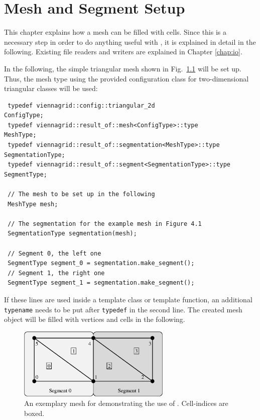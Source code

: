 \chapter{Mesh and Segment Setup} \label{chap:meshsetup}

This chapter explains how a {\ViennaGrid} mesh can be filled with cells. Since this
is a necessary step in order to do anything useful with {\ViennaGrid}, it is explained in detail in the following.
Existing file readers and writers are explained in Chapter \ref{chap:io}.


In the following, the simple triangular mesh shown in Fig.~\ref{fig:samplemesh} will be set up.
Thus, the mesh type using the provided configuration class for two-dimensional triangular classes will be used:
\begin{lstlisting}
 typedef viennagrid::config::triangular_2d                      ConfigType;
 typedef viennagrid::result_of::mesh<ConfigType>::type        MeshType;
 typedef viennagrid::result_of::segmentation<MeshType>::type  SegmentationType;
 typedef viennagrid::result_of::segment<SegmentationType>::type  SegmentType;

 // The mesh to be set up in the following
 MeshType mesh;
 
 // The segmentation for the example mesh in Figure 4.1
 SegmentationType segmentation(mesh);
 
 // Segment 0, the left one
 SegmentType segment_0 = segmentation.make_segment();
 // Segment 1, the right one
 SegmentType segment_1 = segmentation.make_segment();
\end{lstlisting}
If these lines are used inside a template class or template function, an additional \lstinline|typename| needs to be put after \lstinline|typedef| in the second line.
The created mesh object will be filled with vertices and cells in the following.

\begin{figure}[tb]
\centering
 \includegraphics[width=0.65\textwidth]{figures/samplemesh.eps}
 \caption{An exemplary mesh for demonstrating the use of {\ViennaGrid}. Cell-indices are boxed.}
 \label{fig:samplemesh}
\end{figure}

